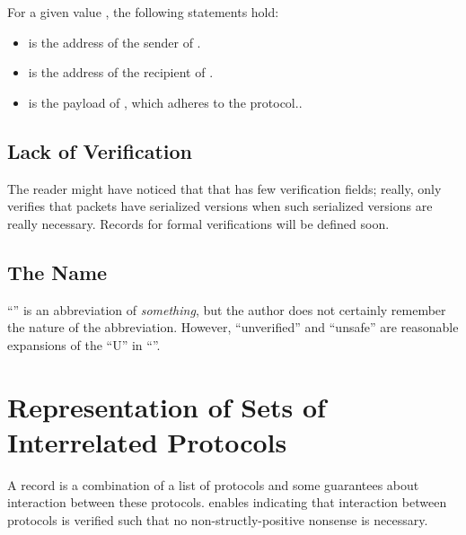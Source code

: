 \documentclass{report}
\begin{document}
For a given   value , the following statements hold:
\begin{itemize}
	\item {}  is the address of the sender of .
	\item {}  is the address of the recipient of .
	\item {}  is the payload of , which adheres to the   protocol..
\end{itemize}

\section{Lack of Verification}
The reader might have noticed that that  has few verification fields; really,  only verifies that packets have serialized versions when such serialized versions are really necessary.  Records for formal verifications will be defined soon.

\section{The Name}
``'' is an abbreviation of \emph{something}, but the author does not certainly remember the nature of the abbreviation.  However, ``unverified'' and ``unsafe'' are reasonable expansions of the ``U'' in ``''.

\chapter{Representation of Sets of Interrelated Protocols}
A  record is a combination of a list of protocols and some guarantees about interaction between these protocols.   enables indicating that interaction between protocols is verified such that no non-structly-positive nonsense is necessary.
\end{document}
